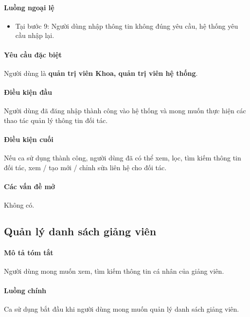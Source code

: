 \documentclass[./../main.tex]{subfiles}
\begin{document}
\paragraph*{Luồng ngoại lệ}

\begin{itemize}
  \item
    
  Tại bước 9: Người dùng nhập thông tin không đúng yêu cầu, hệ thống yêu cầu nhập lại.
  
\end{itemize}

\paragraph*{Yêu cầu đặc biệt}

Người dùng là \textbf{quản trị viên Khoa, quản trị viên hệ thống}.

\paragraph*{Điều kiện đầu}

Người dùng đã đăng nhập thành công vào hệ thống và mong muốn thực hiện các thao tác quản lý thông tin đối tác.

\paragraph*{Điều kiện cuối}

Nếu ca sử dụng thành công, người dùng đã có thể xem, lọc, tìm kiếm thông tin đối tác, xem / tạo mới / chỉnh sửa liên hệ cho đối tác.

\paragraph*{Các vấn đề mở}

Không có.

\subsection{Quản lý danh sách giảng viên}

\paragraph*{Mô tả tóm tắt}

Người dùng mong muốn xem, tìm kiếm thông tin cá nhân của giảng viên.

\paragraph*{Luồng chính} Ca sử dụng bắt đầu khi người dùng mong muốn quản lý danh sách giảng viên.
\end{document}
